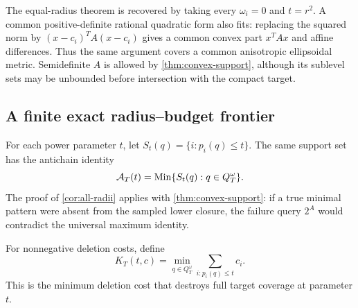 The equal-radius theorem is recovered by taking every $\omega_i=0$ and $t=r^2$. A common positive-definite rational quadratic form also fits: replacing the squared norm by $(x-c_i)^TA(x-c_i)$ gives a common convex part $x^TAx$ and affine differences. Thus the same argument covers a common anisotropic ellipsoidal metric. Semidefinite $A$ is allowed by \cref{thm:convex-support}, although its sublevel sets may be unbounded before intersection with the compact target.

\subsection{A finite exact radius--budget frontier}
For each power parameter $t$, let $S_t(q)=\{i:p_i(q)\le t\}$. The same support set has the antichain identity
\begin{equation}\label{eq:power-antichain}
\mathcal A_T(t)=\operatorname{Min}\{S_t(q):q\in Q_T^\omega\}.
\end{equation}
The proof of \cref{cor:all-radii} applies with \cref{thm:convex-support}: if a true minimal pattern were absent from the sampled lower closure, the failure query $2^A$ would contradict the universal maximum identity.

For nonnegative deletion costs, define
\begin{equation}\label{eq:frontier}
K_T(t,c)=\min_{q\in Q_T^\omega}\sum_{i:p_i(q)\le t}c_i.
\end{equation}
This is the minimum deletion cost that destroys full target coverage at parameter $t$.

